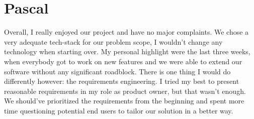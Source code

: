 \section{Pascal}
Overall, I really enjoyed our project and have no major complaints.
We chose a very adequate tech-stack for our problem scope, I wouldn't change any technology when starting over.
My personal highlight were the last three weeks, when everybody got to work on new features and we were able to extend our software without any significant roadblock.
There is one thing I would do differently however: the requirements engineering.
I tried my best to present reasonable requirements in my role as product owner, but that wasn't enough.
We should've prioritized the requirements from the beginning and spent more time questioning potential end users to tailor our solution in a better way.

